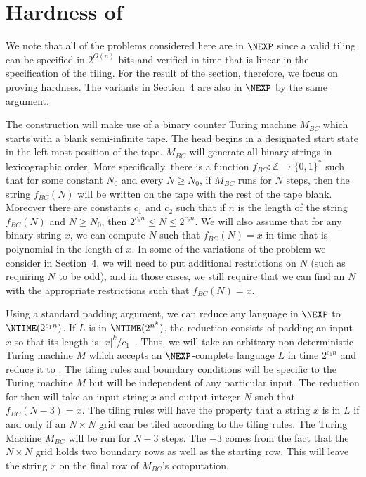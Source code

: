 \section{Hardness of \tiling}
\label{sec:tiling}

We note that all of the problems
considered here are in $\NEXP$ since a valid tiling can be specified in
$2^{O(n)}$ bits and verified in time that is linear in the specification of the tiling.
For the result of the section, therefore, we focus on proving hardness.
The variants in Section~4 are also in $\NEXP$ by the same argument.

The construction will make use of a
binary counter Turing machine $M_{BC}$
which
starts with a blank semi-infinite tape. The head begins in a designated start
state in the left-most position of the tape. $M_{BC}$ will generate all
binary strings in lexicographic order. More specifically, there is a
function $f_{BC}: \mathbb{Z} \rightarrow \{0,1\}^*$ such that for some
constant $N_0$ and
every $N \ge N_0$, if $M_{BC}$ runs for $N$ steps, then the string $f_{BC}(N)$
will be written on the tape with the rest of the tape blank.
Moreover there are constants $c_1$ and $c_2$ such that
if $n$ is the length of the string $f_{BC}(N)$ and
$N \ge N_0$, then
$2^{c_1 n} \le N \le 2^{c_2 n}$.
We will also assume that for any binary string $x$, we can compute $N$
such that $f_{BC}(N) = x$ in time that is polynomial in the length of $x$.  In some of the variations of the problem we consider in
Section~4, we will need to put additional restrictions on $N$ (such as requiring $N$ to be odd), and in those cases, we still require
that we can find an $N$ with the appropriate restrictions such that $f_{BC}(N) = x$.

Using a standard padding argument, we can reduce any language in
$\NEXP$ to $\NTIME(2^{c_1 n})$. If $L$ is in $\NTIME(2^{n^k})$, the reduction
consists of padding an input $x$ so that its length is $|x|^k/c_1$~\cite{papa95}.
Thus, we will take an arbitrary non-deterministic Turing machine $M$ which accepts
an $\NEXP$-complete language $L$ in time $2^{c_1 n}$ and reduce it to \tiling.
The tiling rules and boundary conditions
will be specific to the Turing machine $M$ but will be independent
of any particular input. The reduction for 
then will take an input string $x$ and output
integer $N$ such that $f_{BC}(N-3)=x$. The tiling rules will have the property that
a string $x$ is in $L$ if and only if an $N \times N$ grid can be tiled according
to the tiling rules.
The Turing Machine $M_{BC}$ will be run for $N-3$ steps.
The $-3$ comes from the fact that the $N \times N$ grid holds two boundary rows as well
as the starting row.  This will leave the string $x$ on the final row of $M_{BC}$'s
computation.

